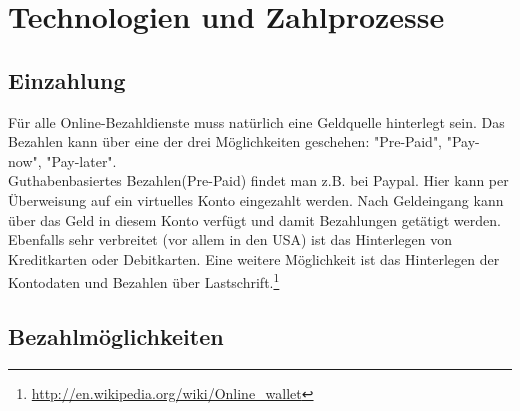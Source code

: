 \section{Technologien und Zahlprozesse}

\subsection{Einzahlung}
Für alle Online-Bezahldienste muss natürlich eine Geldquelle hinterlegt sein. Das Bezahlen kann über eine der drei Möglichkeiten geschehen: "Pre-Paid", "Pay-now", "Pay-later".\\
Guthabenbasiertes Bezahlen(Pre-Paid) findet man z.B. bei Paypal. Hier kann per Überweisung auf ein virtuelles Konto eingezahlt werden. Nach Geldeingang kann über das Geld in diesem Konto verfügt und damit Bezahlungen getätigt werden.
Ebenfalls sehr verbreitet (vor allem in den USA) ist das Hinterlegen von Kreditkarten oder Debitkarten. Eine weitere Möglichkeit ist das Hinterlegen der Kontodaten und Bezahlen über Lastschrift.\footnote{\url{http://en.wikipedia.org/wiki/Online_wallet}}

\subsection{Bezahlmöglichkeiten}
